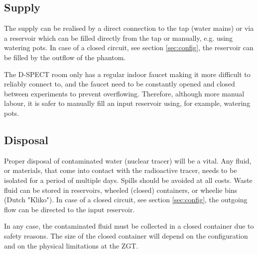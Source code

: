 \subsection*{Supply}
The supply can be realised by a direct connection to the tap (water mains) or via a reservoir which can be filled directly from the tap or manually, e.g. using watering pots. In case of a closed circuit, see section \ref{sec:config}, the reservoir can be filled by the outflow of the phantom.

The D-SPECT room only has a regular indoor faucet making it more difficult to reliably connect to, and the faucet need to be constantly opened and closed between experiments to prevent overflowing. Therefore, although more manual labour, it is safer to manually fill an input reservoir using, for example, watering pots.
\subsection*{Disposal}
Proper disposal of contaminated water (nuclear tracer) will be a vital. Any fluid, or materials, that come into contact with the radioactive tracer, needs to be isolated for a period of multiple days. Spills should be avoided at all costs. Waste fluid can be stored in reservoirs, wheeled (closed) containers, or wheelie bins (Dutch "Kliko"). In case of a closed circuit, see section \ref{sec:config}, the outgoing flow can be directed to the input reservoir.

In any case, the contaminated fluid must be collected in a closed container due to safety reasons. The size of the closed container will depend on the configuration and on the physical limitations at the ZGT.

